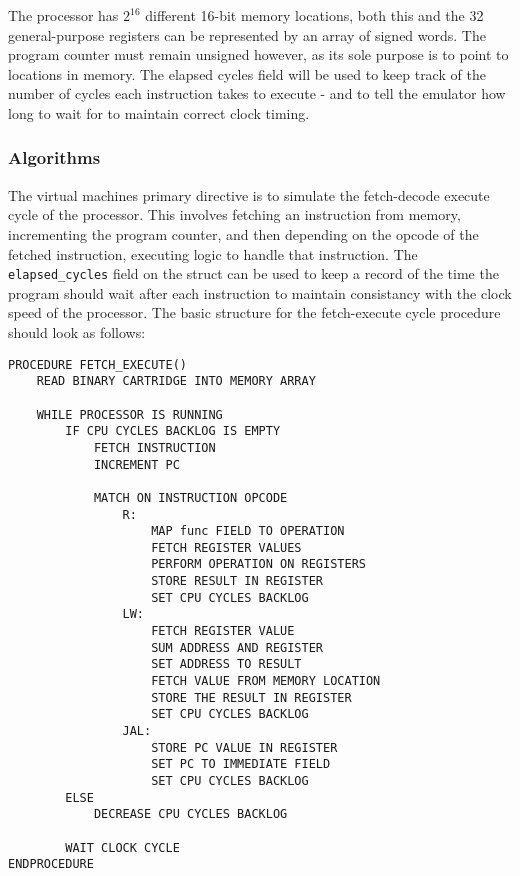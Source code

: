The processor has $2^{16}$ different 16-bit memory locations, both this and the 32 general-purpose registers can be  represented by an array of signed words. The program counter must remain unsigned however, as its sole purpose is to point to locations in memory. The elapsed cycles field will be used to keep track of the number of cycles each instruction takes to execute - and to tell the emulator how long to wait for to maintain correct clock timing.

\subsubsection{Algorithms}

The virtual machines primary directive is to simulate the fetch-decode execute cycle of the processor. This involves fetching an instruction from memory, incrementing the program counter, and then depending on the opcode of the fetched instruction, executing logic to handle that instruction. The \texttt{elapsed\_cycles} field on the struct can be used to keep a record of the time the program should wait after each instruction to maintain consistancy with the clock speed of the processor. The basic structure for the fetch-execute cycle procedure should look as follows:

\begin{lstlisting}
PROCEDURE FETCH_EXECUTE()
    READ BINARY CARTRIDGE INTO MEMORY ARRAY

    WHILE PROCESSOR IS RUNNING
        IF CPU CYCLES BACKLOG IS EMPTY
            FETCH INSTRUCTION 
            INCREMENT PC

            MATCH ON INSTRUCTION OPCODE 
                R: 
                    MAP func FIELD TO OPERATION 
                    FETCH REGISTER VALUES 
                    PERFORM OPERATION ON REGISTERS 
                    STORE RESULT IN REGISTER 
                    SET CPU CYCLES BACKLOG 
                LW:
                    FETCH REGISTER VALUE
                    SUM ADDRESS AND REGISTER
                    SET ADDRESS TO RESULT
                    FETCH VALUE FROM MEMORY LOCATION
                    STORE THE RESULT IN REGISTER
                    SET CPU CYCLES BACKLOG
                JAL:
                    STORE PC VALUE IN REGISTER
                    SET PC TO IMMEDIATE FIELD
                    SET CPU CYCLES BACKLOG
        ELSE 
            DECREASE CPU CYCLES BACKLOG

        WAIT CLOCK CYCLE
ENDPROCEDURE
\end{lstlisting}

